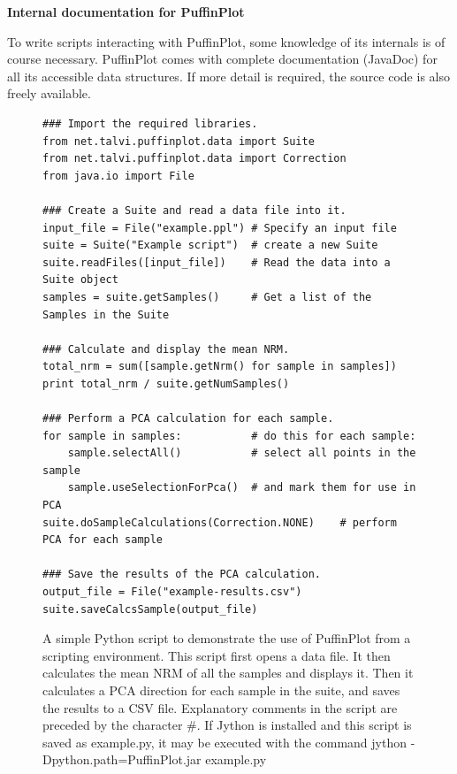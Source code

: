 \documentclass[a4paper,british]{article}
\newcommand{\ppcmd}[1]{\textsf{#1}} %
\newcommand{\caps}[1]{\MakeTextUppercase{#1}} %
\newcommand{\mypara}[1]{\noindent\textbf{#1}

\noindent\ignorespaces} %
\begin{document}
\mypara{Internal documentation for PuffinPlot} To write scripts
interacting with PuffinPlot, some knowledge of its internals is of course
necessary. PuffinPlot comes with complete documentation (JavaDoc) for all its
accessible data structures. If more detail is required, the source code is
also freely available.

\begin{figure}
  \caption{\label{fig:script-example-1}A simple Python script to demonstrate
    the use of PuffinPlot from a scripting environment. This script first
    opens a data file. It then calculates the mean \caps{nrm} of all the
    samples and displays it. Then it calculates a \caps{pca} direction for
    each sample in the suite, and saves the results to a \caps{csv} file.
    Explanatory comments in the script are preceded by the character \#. If
    Jython is installed and this script is saved as \ppcmd{example.py}, it
    may be executed with the command \ppcmd{jython
      -Dpython.path=PuffinPlot.jar example.py}}
  \lstset{language=Python}
\begin{lstlisting}
### Import the required libraries.
from net.talvi.puffinplot.data import Suite
from net.talvi.puffinplot.data import Correction
from java.io import File

### Create a Suite and read a data file into it.
input_file = File("example.ppl") # Specify an input file
suite = Suite("Example script")  # create a new Suite
suite.readFiles([input_file])    # Read the data into a Suite object
samples = suite.getSamples()     # Get a list of the Samples in the Suite

### Calculate and display the mean NRM.
total_nrm = sum([sample.getNrm() for sample in samples])
print total_nrm / suite.getNumSamples()

### Perform a PCA calculation for each sample.
for sample in samples:           # do this for each sample:
    sample.selectAll()           # select all points in the sample
    sample.useSelectionForPca()  # and mark them for use in PCA
suite.doSampleCalculations(Correction.NONE)    # perform PCA for each sample

### Save the results of the PCA calculation.
output_file = File("example-results.csv")
suite.saveCalcsSample(output_file)
\end{lstlisting}
\end{figure}
\end{document}
